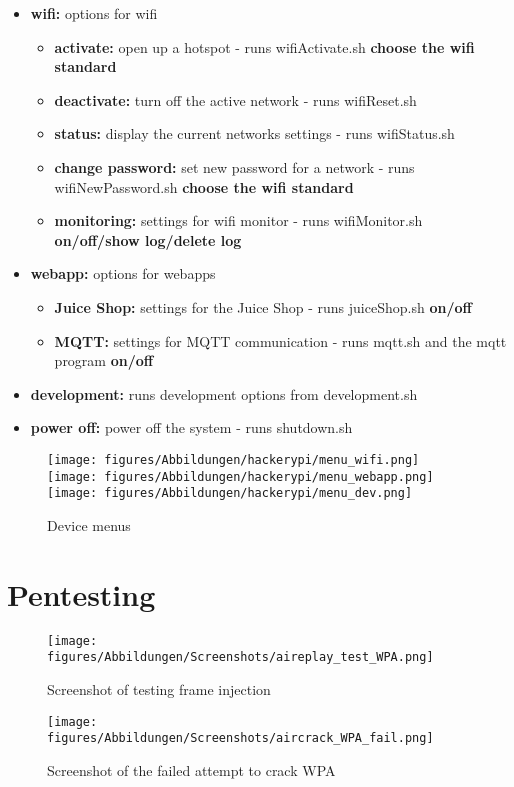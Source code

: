 \begin{itemize}
    \setlength\itemsep{0.1cm}
    \item \textbf{wifi:} options for wifi
        \begin{itemize}
            \item \textbf{activate:} open up a hotspot - runs wifiActivate.sh
                \subitem \textbf{choose the wifi standard}
            \item \textbf{deactivate:} turn off the active network - runs wifiReset.sh
            \item \textbf{status:} display the current networks settings - runs wifiStatus.sh
            \item \textbf{change password:} set new password for a network - runs wifiNewPassword.sh
                \subitem \textbf{choose the wifi standard}
            \item \textbf{monitoring:} settings for wifi monitor - runs wifiMonitor.sh
                \subitem \textbf{on/off/show log/delete log} 
        \end{itemize}
    \item \textbf{webapp:} options for webapps
        \begin{itemize}
            \item \textbf{Juice Shop:} settings for the Juice Shop - runs juiceShop.sh
                \subitem \textbf{on/off}
            \item \textbf{MQTT:} settings for MQTT communication - runs mqtt.sh and the mqtt program
                \subitem \textbf{on/off}
        \end{itemize}
    \item \textbf{development:} runs development options from development.sh
    \item \textbf{power off:} power off the system - runs shutdown.sh
\end{itemize}

\begin{figure}[h]
    \texttt{[image: figures/Abbildungen/hackerypi/menu\_wifi.png]}
    \texttt{[image: figures/Abbildungen/hackerypi/menu\_webapp.png]}
    \texttt{[image: figures/Abbildungen/hackerypi/menu\_dev.png]}
    \centering
    \caption{Device menus}
    \label{fig:menus}
\end{figure}

\newpage
\section{Pentesting}

\begin{figure}[h]
    \centering
    \texttt{[image: figures/Abbildungen/Screenshots/aireplay\_test\_WPA.png]}
    \caption{Screenshot of testing frame injection}
    \label{fig:aireplay_test_WPA}
\end{figure}

\begin{figure}[h]
    \centering
    \texttt{[image: figures/Abbildungen/Screenshots/aircrack\_WPA\_fail.png]}
    \caption{Screenshot of the failed attempt to crack WPA}
    \label{fig:aircrack-ng_WPA_fail}
\end{figure}